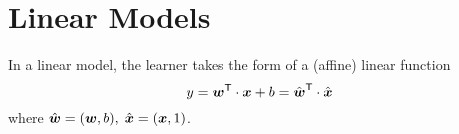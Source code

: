 \section{Linear Models}
In a linear model, the learner takes the form of a (affine) linear function
\[y = {\boldsymbol{w}}^\mathsf{T} \cdot \boldsymbol{x} + b = {\hat{\boldsymbol{w}}}^\mathsf{T} \cdot \hat{\boldsymbol{x}}\]
where $\hat{\boldsymbol{w}}=(\boldsymbol{w}, b),\;\hat{\boldsymbol{x}} = (\boldsymbol{x}, 1)$.
